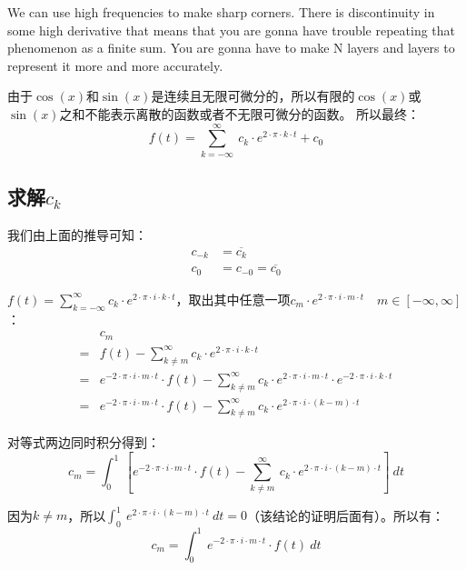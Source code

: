 We can use high frequencies to make sharp corners.
There is discontinuity in some high derivative that means that you are gonna have trouble repeating that phenomenon as a finite sum.
You are gonna have to make N layers and layers to represent it more and more accurately.

由于$\cos(x)$和$\sin(x)$是连续且无限可微分的，所以有限的$\cos(x)$或$\sin(x)$之和不能表示离散的函数或者不无限可微分的函数。
所以最终：
\begin{equation}
	f(t)=\sum\limits_{k=-\infty}^\infty\ c_k\cdot e^{2\cdot \pi\cdot k\cdot t}+c_0
\end{equation}
\subsection{求解$c_k$}
我们由上面的推导可知：
\begin{align*}
	c_{-k} & =\overline{c_k}        \\
	c_0    & =c_{-0}=\overline{c_0}
\end{align*}

$f(t)=\sum\limits_{k=-\infty}^\infty c_k\cdot e^{2\cdot \pi \cdot i \cdot k \cdot t}$，取出其中任意一项$c_m\cdot e^{2\cdot \pi \cdot i\cdot m\cdot t} \quad m\in[-\infty,\infty]$：
\begin{align*}
	  & c_m                                                                                                                                                                 \\
	= & f(t)-\sum\limits_{k\neq m}^\infty c_k\cdot e^{2\cdot \pi\cdot i\cdot k\cdot t}                                                                                      \\
	= & e^{-2\cdot \pi \cdot i\cdot m\cdot t}\cdot f(t)-\sum\limits_{k\neq m}^\infty c_k\cdot e^{2\cdot \pi\cdot i\cdot m\cdot t}\cdot e^{-2\cdot \pi\cdot i\cdot k\cdot t} \\
	= & e^{-2\cdot \pi\cdot i\cdot m\cdot t}\cdot f(t)-\sum\limits_{k\neq m}^\infty c_k\cdot e^{2\cdot \pi\cdot i\cdot (k-m)\cdot t}
\end{align*}

对等式两边同时积分得到：
$$
	c_m=\int_0^1\ [e^{-2\cdot \pi\cdot i\cdot m\cdot t}\cdot f(t)-\sum\limits_{k\neq m}^\infty\ c_k\cdot e^{2\cdot \pi\cdot i\cdot (k-m)\cdot t}]\ dt
$$

因为$k\neq m$，所以$\int_0^1\ e^{2\cdot \pi\cdot i\cdot (k-m)\cdot t}\ dt=0$（该结论的证明后面有）。所以有：
$$
	c_m=\int_0^1 \ e^{-2\cdot \pi\cdot i\cdot m\cdot t}\cdot f(t)\ dt
$$

